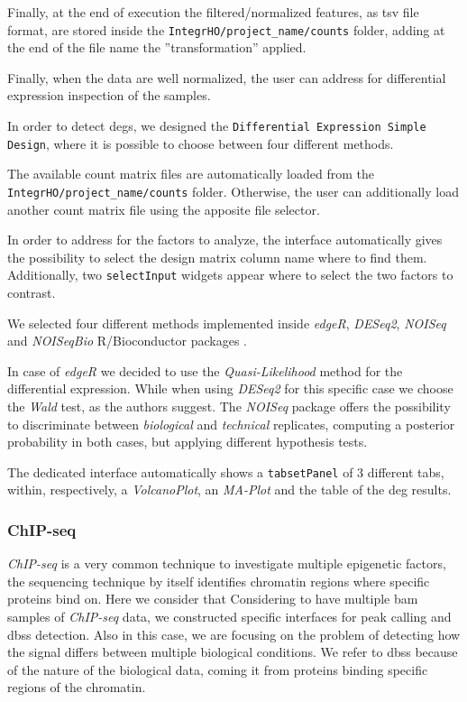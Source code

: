Finally, at the end of execution the filtered/normalized features, as \gls{tsv} file format, are stored inside the \lstinline!IntegrHO/project_name/counts! folder, adding at the end of the file name the ''transformation'' applied.



Finally, when the data are well normalized, the user can address for differential expression inspection of the samples.

In order to detect \glspl{deg}, we designed the \lstinline!Differential Expression Simple Design!, where it is possible to choose between four different methods.

The available count matrix files are automatically loaded from the \lstinline!IntegrHO/project_name/counts! folder.
Otherwise, the user can additionally load another count matrix file using the apposite file selector.

In order to address for the factors to analyze, the interface automatically gives the possibility to select the design matrix column name where to find them.
Additionally, two \lstinline!selectInput! widgets appear where to select the two factors to contrast.

We selected four different methods implemented inside \textit{edgeR}, \textit{DESeq2}, \textit{NOISeq} and \textit{NOISeqBio} R/Bioconductor packages \cite{Robinson2009, Love2014,Tarazona2012}.

In case of \textit{edgeR} we decided to use the \textit{Quasi-Likelihood} method for the differential expression.
While when using \textit{DESeq2} for this specific case we choose the \textit{Wald} test, as the authors suggest.
The \textit{NOISeq} package offers the possibility to discriminate between \textit{biological} and \textit{technical} replicates, computing a posterior probability in both cases, but applying different hypothesis tests.

The dedicated interface automatically shows a \lstinline!tabsetPanel! of 3 different tabs, within, respectively, a \textit{VolcanoPlot}, an \textit{MA-Plot} and the table of the \gls{deg} results.


\subsubsection{ChIP-seq} \label{sec:integrhochip}
\textit{ChIP-seq} is a very common technique to investigate multiple epigenetic factors, the sequencing technique by itself identifies chromatin regions where specific proteins bind on.
Here we consider that
Considering to have multiple \gls{bam} samples of \textit{ChIP-seq} data, we constructed specific interfaces for peak calling and \glspl{dbs} detection.
Also in this case, we are focusing on the problem of detecting how the signal differs between multiple biological conditions.
We refer to \glspl{dbs} because of the nature of the biological data, coming it from proteins binding specific regions of the chromatin.

